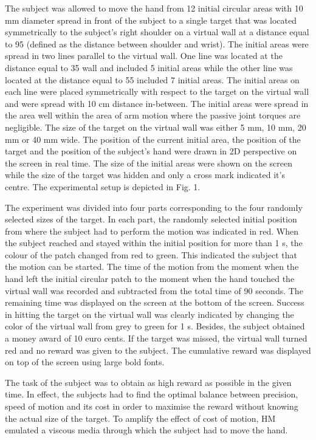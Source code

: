 \documentclass[pdftex,a4paper,12pt]{report}
\begin{document}
The subject was allowed to move the hand from 12 initial circular areas
with 10 mm diameter spread in front of the subject to a single target
that was located symmetrically to the subject’s right shoulder on a
virtual wall at a distance equal to 95%
(defined as the distance between shoulder and wrist). The initial areas
were spread in two lines parallel to the virtual wall. One line was
located at the distance equal to 35%
wall and included 5 initial areas while the other line was located at
the distance equal to 55%
included 7 initial areas. The initial areas on each line were placed
symmetrically with respect to the target on the virtual wall and were
spread with 10 cm distance in-between. The initial areas were spread in
the area well within the area of arm motion where the passive joint
torques are negligible. The size of the target on the virtual wall was
either 5 mm, 10 mm, 20 mm or 40 mm wide. The position of the current
initial area, the position of the target and the position of the
subject’s hand were drawn in 2D perspective on the screen in real
time. The size of the initial areas were shown on the screen while the
size of the target was hidden and only a cross mark indicated it’s
centre. The experimental setup is depicted in Fig. 1.

The experiment was divided into four parts corresponding to the four
randomly selected sizes of the target. In each part, the randomly
selected initial position from where the subject had to perform the
motion was indicated in red. When the subject reached and stayed within
the initial position for more than 1 s, the colour of the patch changed
from red to green. This indicated the subject that the motion can be
started. The time of the motion from the moment when the hand left the
initial circular patch to the moment when the hand touched the virtual
wall was recorded and subtracted from the total time of 90 seconds. The
remaining time was displayed on the screen at the bottom of the screen.
Success in hitting the target on the virtual wall was clearly indicated
by changing the color of the virtual wall from grey to green for 1 s.
Besides, the subject obtained a money award of 10 euro cents. If the
target was missed, the virtual wall turned red and no reward was given
to the subject. The cumulative reward was displayed on top of the screen
using large bold fonts.

The task of the subject was to obtain as high reward as possible in the
given time. In effect, the subjects had to find the optimal balance
between precision, speed of motion and its cost in order to maximise the
reward without knowing the actual size of the target. To amplify the
effect of cost of motion, HM emulated a viscous media through which the
subject had to move the hand.



\end{document}
